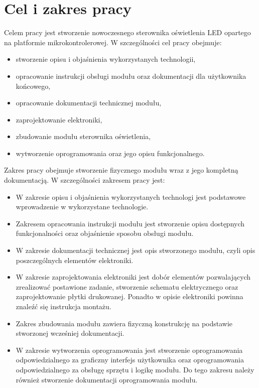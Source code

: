 \documentclass[12pt, eng, twoside, openany, final]{mgr}
\begin{document}
    \section{Cel i zakres pracy}
    Celem pracy jest stworzenie nowoczesnego sterownika oświetlenia LED opartego na platformie mikrokontrolerowej. W szczególności cel pracy obejmuje: 
    \begin{itemize}
        \item stworzenie opisu i objaśnienia wykorzystanych technologii,
        \item opracowanie instrukcji obsługi modułu oraz dokumentacji dla użytkownika końcowego,
        \item opracowanie dokumentacji technicznej modułu,
        \item zaprojektowanie elektroniki, 
        \item zbudowanie modułu sterownika oświetlenia,
        \item wytworzenie oprogramowania oraz jego opisu funkcjonalnego.
    \end{itemize}
    Zakres pracy obejmuje stworzenie fizycznego modułu wraz z jego kompletną dokumentacją. W szczególności zakresem pracy jest:
    \begin{itemize}
        \item W zakresie opisu i objaśnienia wykorzystanych technologi jest podstawowe wprowadzenie w wykorzystane technologie.
        \item Zakresem opracowania instrukcji modułu jest stworzenie opisu dostępnych funkcjonalności oraz objaśnienie sposobu obsługi modułu.
        \item W zakresie dokumentacji technicznej jest opis stworzonego modułu, czyli opis poszczególnych elementów elektroniki.
        \item W zakresie zaprojektowania elektroniki jest dobór elementów pozwalających zrealizować postawione zadanie, stworzenie schematu elektrycznego oraz zaprojektowanie płytki drukowanej. Ponadto w opisie elektroniki powinna znaleźć się instrukcja montażu. 
        \item Zakres zbudowania modułu zawiera fizyczną konstrukcję na podstawie stworzonej wcześniej dokumentacji.
        \item W zakresie wytworzenia oprogramowania jest stworzenie oprogramowania odpowiedzialnego za graficzny interfejs użytkownika oraz oprogramowania odpowiedzialnego za obsługę sprzętu i logikę modułu. Do tego zakresu należy również stworzenie dokumentacji oprogramowania modułu.
    \end{itemize}
%
\end{document}
